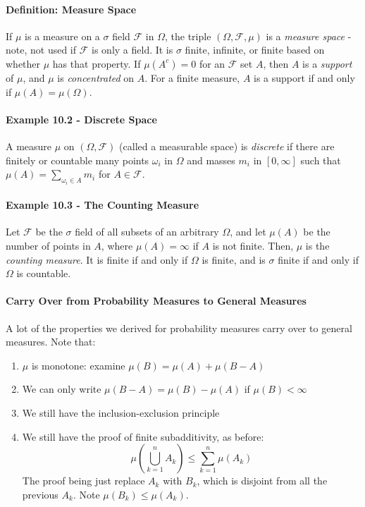 \documentclass[12pt,a4paper]{article}
\newcommand{\1}[1]{\mathbbm{1}\left\{ #1 \right\}}
\newcommand{\fcal}{\mathcal{F}}
\begin{document}
\paragraph{Definition: Measure Space} If $\mu$ is a measure on a $\sigma$ field $\fcal$ in $\Omega$, the triple $(\Omega, \fcal, \mu)$ is a \textit{measure space} - note, not used if $\fcal$ is only a field. It is $\sigma$ finite, infinite, or finite based on whether $\mu$ has that property. If $\mu(A^c) = 0$ for an $\fcal$ set $A$, then $A$ is a \textit{support} of $\mu$, and $\mu$ is \textit{concentrated} on $A$. For a finite measure, $A$ is a support if and only if $\mu(A) = \mu(\Omega)$.

\paragraph{Example 10.2 - Discrete Space} A measure $\mu$ on $(\Omega, \fcal)$ (called a measurable space) is \textit{discrete} if there are finitely or countable many points $\omega_i$ in $\Omega$ and masses $m_i$ in $[0,\infty]$ such that $\mu(A) = \sum_{\omega_i \in A} m_i$ for $A \in \fcal$. 

\paragraph{Example 10.3 - The Counting Measure} Let $\fcal$ be the $\sigma$ field of all subsets of an arbitrary $\Omega$, and let $\mu(A)$ be the number of points in $A$, where $\mu(A) = \infty$ if $A$ is not finite. Then, $\mu$ is the \textit{counting measure}. It is finite if and only if $\Omega$ is finite, and is $\sigma$ finite if and only if $\Omega$ is countable.

\paragraph{Carry Over from Probability Measures to General Measures} A lot of the properties we derived for probability measures carry over to general measures. Note that:
\begin{enumerate}
	\item $\mu$ is monotone: examine $\mu(B) = \mu(A) + \mu(B - A)$
	\item We can only write $\mu(B - A) = \mu(B) - \mu(A)$ if $\mu(B) < \infty$
	\item We still have the inclusion-exclusion principle
	\item We still have the proof of finite subadditivity, as before:
	$$
		\mu\left(\bigcup_{k=1}^n A_k\right) \leq
		\sum_{k=1}^n \mu(A_k)
	$$
	The proof being just replace $A_k$ with $B_k$, which is disjoint from all the previous $A_k$. Note $\mu(B_k) \leq \mu(A_k)$.
\end{enumerate}
\end{document}
